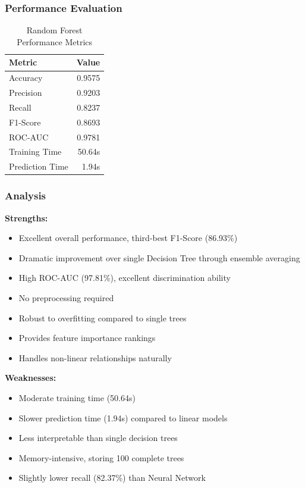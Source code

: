 \documentclass[sigconf]{acmart}
\begin{document}
\subsubsection{Performance Evaluation}
\begin{table}[h]
\centering
\caption{Random Forest Performance Metrics}
\begin{tabular}{lr}
\toprule
Metric & Value \\
\midrule
Accuracy & 0.9575 \\
Precision & 0.9203 \\
Recall & 0.8237 \\
F1-Score & 0.8693 \\
ROC-AUC & 0.9781 \\
Training Time & 50.64s \\
Prediction Time & 1.94s \\
\bottomrule
\end{tabular}
\end{table}

\subsubsection{Analysis}
\textbf{Strengths:}
\begin{itemize}
    \item Excellent overall performance, third-best F1-Score (86.93\%)
    \item Dramatic improvement over single Decision Tree through ensemble averaging
    \item High ROC-AUC (97.81\%), excellent discrimination ability
    \item No preprocessing required
    \item Robust to overfitting compared to single trees
    \item Provides feature importance rankings
    \item Handles non-linear relationships naturally
\end{itemize}

\textbf{Weaknesses:}
\begin{itemize}
    \item Moderate training time (50.64s)
    \item Slower prediction time (1.94s) compared to linear models
    \item Less interpretable than single decision trees
    \item Memory-intensive, storing 100 complete trees
    \item Slightly lower recall (82.37\%) than Neural Network
\end{itemize}
\end{document}

